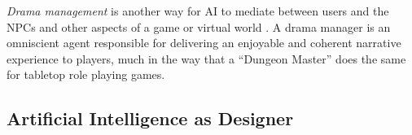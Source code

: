\documentclass[conference]{IEEEtran}
\begin{document}
{\em Drama management} is another way for AI to mediate between users and the NPCs and other aspects of a game or virtual world \cite{mateas1999:oz-review-dm, roberts2008:dm-review, riedl2013:in-aimag}. 
A drama manager is an omniscient agent responsible for delivering an enjoyable and coherent narrative experience to players, much in the way that a ``Dungeon Master'' does the same for tabletop role playing games.

\subsection{Artificial Intelligence as Designer}
\end{document}
